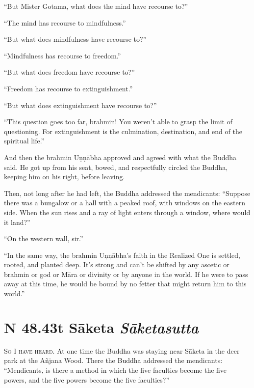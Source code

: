 \documentclass[12pt,openany]{book}%
\newcommand*{\suttatitleacronym}[1]{\smaller[2]{#1}\vspace*{.3em}}
\newcommand*{\suttatitletranslation}[1]{\linebreak{#1}}
\newcommand*{\suttatitleroot}[1]{\linebreak\smaller[2]\itshape{#1}}
\newcommand*{\tocacronym}[1]{\hspace*{-3.3em}{#1}\quad}
\newcommand*{\toctranslation}[1]{#1}
\newcommand*{\tocroot}[1]{(\textit{#1})}
\newcommand*{\scevam}[1]{\textsc{#1}}
\begin{document}
“But Mister Gotama, what does the mind have recourse to?” 

“The mind has recourse to mindfulness.” 

“But what does mindfulness have recourse to?” 

“Mindfulness has recourse to freedom.” 

“But what does freedom have recourse to?” 

“Freedom has recourse to extinguishment.” 

“But what does extinguishment have recourse to?” 

“This question goes too far, brahmin! You weren’t able to grasp the limit of questioning. For extinguishment is the culmination, destination, and end of the spiritual life.” 

And then the brahmin \textsanskrit{Uṇṇābha} approved and agreed with what the Buddha said. He got up from his seat, bowed, and respectfully circled the Buddha, keeping him on his right, before leaving. 

Then, not long after he had left, the Buddha addressed the mendicants: “Suppose there was a bungalow or a hall with a peaked roof, with windows on the eastern side. When the sun rises and a ray of light enters through a window, where would it land?” 

“On the western wall, sir.” 

“In the same way, the brahmin \textsanskrit{Uṇṇābha}’s faith in the Realized One is settled, rooted, and planted deep. It’s strong and can’t be shifted by any ascetic or brahmin or god or \textsanskrit{Māra} or divinity or by anyone in the world. If he were to pass away at this time, he would be bound by no fetter that might return him to this world.” 

%
\section*{{\suttatitleacronym SN 48.43}{\suttatitletranslation At Sāketa }{\suttatitleroot Sāketasutta}}
\addcontentsline{toc}{section}{\tocacronym{SN 48.43} \toctranslation{At Sāketa } \tocroot{Sāketasutta}}

\scevam{So I have heard. }At one time the Buddha was staying near \textsanskrit{Sāketa} in the deer park at the \textsanskrit{Añjana} Wood. There the Buddha addressed the mendicants: “Mendicants, is there a method in which the five faculties become the five powers, and the five powers become the five faculties?” 
\end{document}

